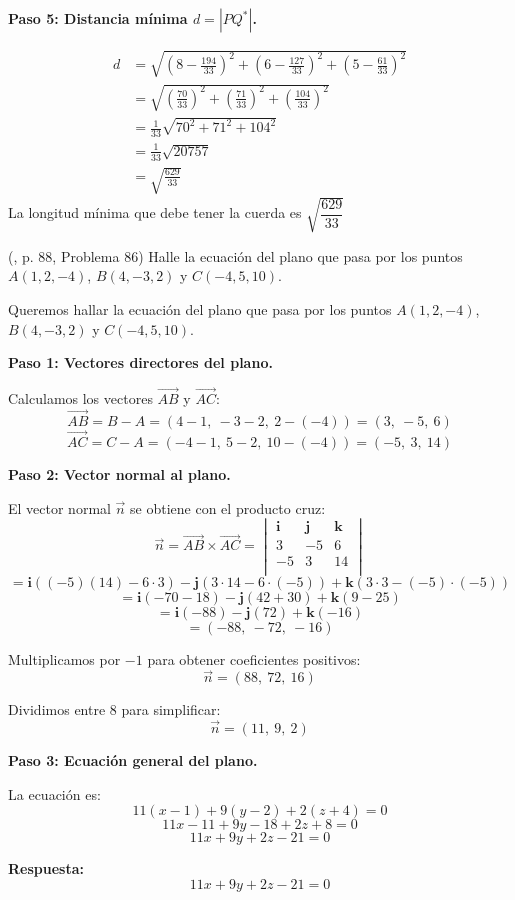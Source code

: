 \begin{prob}
\begin{myproof}
\textbf{Paso 5: Distancia mínima $d = |PQ^*|$.}

\begin{align*}
d &= \sqrt{\left(8 - \frac{194}{33}\right)^2 + \left(6 - \frac{127}{33}\right)^2 + \left(5 - \frac{61}{33}\right)^2}\\
&= \sqrt{\left(\frac{70}{33}\right)^2 + \left(\frac{71}{33}\right)^2 + \left(\frac{104}{33}\right)^2}\\
&= \frac{1}{33} \sqrt{70^2 + 71^2 + 104^2}\\
&= \frac{1}{33}\sqrt{20757}\\
&= \sqrt{\frac{629}{33}}
\end{align*}
La longitud mínima que debe tener la cuerda es \(\boxed{\sqrt{\dfrac{629}{33}}}
\)
\end{myproof}

\end{prob}

\begin{prob} (\cite{espinoza2006Algebralineal}, p. 88, Problema 86) Halle la ecuación del plano que pasa por los puntos $A(1,2,-4)$, $B(4,-3,2)$ y $C(-4,5,10)$. 

\begin{myproof}
Queremos hallar la ecuación del plano que pasa por los puntos $A(1,2,-4)$, $B(4,-3,2)$ y $C(-4,5,10)$.

\textbf{Paso 1: Vectores directores del plano.}

Calculamos los vectores $\vec{AB}$ y $\vec{AC}$:
\[
\vec{AB} = B - A = (4-1,\ -3-2,\ 2-(-4)) = (3,\ -5,\ 6)
\]
\[
\vec{AC} = C - A = (-4-1,\ 5-2,\ 10-(-4)) = (-5,\ 3,\ 14)
\]

\textbf{Paso 2: Vector normal al plano.}

El vector normal $\vec{n}$ se obtiene con el producto cruz:
\[
\vec{n} = \vec{AB} \times \vec{AC}
= \begin{vmatrix}
\mathbf{i} & \mathbf{j} & \mathbf{k} \\
3 & -5 & 6 \\
-5 & 3 & 14 \\
\end{vmatrix}
\]
\[
= \mathbf{i}((-5)(14) - 6 \cdot 3) - \mathbf{j}(3 \cdot 14 - 6 \cdot (-5)) + \mathbf{k}(3 \cdot 3 - (-5) \cdot (-5))
\]
\[
= \mathbf{i}(-70 - 18) - \mathbf{j}(42 + 30) + \mathbf{k}(9 - 25)
\]
\[
= \mathbf{i}(-88) - \mathbf{j}(72) + \mathbf{k}(-16)
\]
\[
= (-88,\ -72,\ -16)
\]

Multiplicamos por $-1$ para obtener coeficientes positivos:
\[
\vec{n} = (88,\ 72,\ 16)
\]

Dividimos entre $8$ para simplificar:
\[
\vec{n} = (11,\ 9,\ 2)
\]

\textbf{Paso 3: Ecuación general del plano.}

La ecuación es:
\[
11(x - 1) + 9(y - 2) + 2(z + 4) = 0
\]
\[
11x - 11 + 9y - 18 + 2z + 8 = 0
\]
\[
11x + 9y + 2z - 21 = 0
\]

\textbf{Respuesta:}
\[
\boxed{11x + 9y + 2z - 21 = 0}
\]
\end{myproof}

\end{prob}

